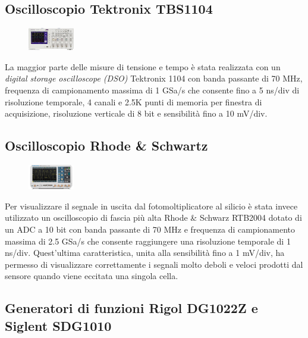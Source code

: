 \documentclass[journal]{IEEEtran}
\begin{document}
\subsection{\textbf{Oscilloscopio Tektronix TBS1104}}

\begin{figure}[h!]
  \centering
  \includegraphics[width=0.18\textwidth]{lab-reports/Schematics-and-graphics/TEK Osc.png}
\end{figure}

La maggior parte delle misure di tensione e tempo è stata realizzata con un \textit{digital storage oscilloscope (DSO)} Tektronix 1104 con banda passante di 70 MHz, frequenza di campionamento massima di 1 GSa/s che consente fino a 5 ns/div di risoluzione temporale, 4 canali e 2.5K punti di memoria per finestra di acquisizione, risoluzione verticale di 8 bit e sensibilità fino a 10 mV/div.

\subsection{\textbf{Oscilloscopio Rhode & Schwartz}}

\begin{figure}[h!]
  \centering
  \includegraphics[width=0.18\textwidth]{lab-reports/Schematics-and-graphics/RS Osc.png}
\end{figure}

Per visualizzare il segnale in uscita dal fotomoltiplicatore al silicio è stata invece utilizzato un oscilloscopio di fascia più alta Rhode & Schwarz RTB2004 dotato di un ADC a 10 bit con banda passante di 70 MHz e frequenza di campionamento massima di 2.5 GSa/s che consente raggiungere una risoluzione temporale di 1 ns/div. Quest'ultima caratteristica, unita alla sensibilità fino a 1 mV/div, ha permesso di visualizzare correttamente i segnali molto deboli e veloci prodotti dal sensore quando viene eccitata una singola cella.

\subsection{\textbf{Generatori di funzioni Rigol DG1022Z e Siglent SDG1010}}
\end{document}
